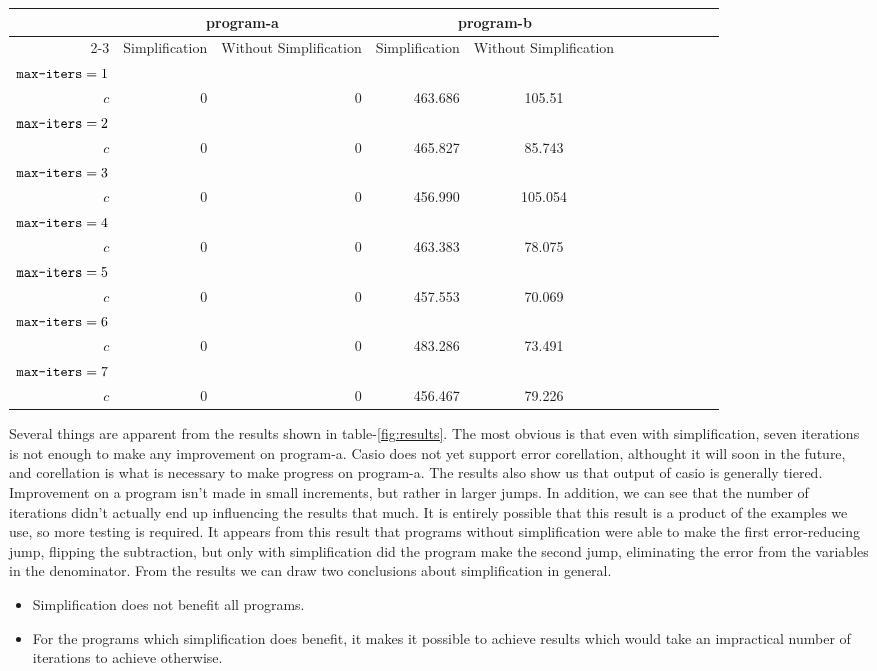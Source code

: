 \documentclass{article}
\begin{document}
\newcommand{\ra}[1]{\renewcommand{\arraystretch}{#1}}
\begin{table*}\centering
\ra{0.8}
\begin{tabular}{@{}rrrrcrrrcrrr@{}}
\toprule&\multicolumn{2}{c}{program-a} &\multicolumn{2}{c}{program-b} &\\
\cmidrule{2-3}\cmidrule{4-5}
& Simplification & Without Simplification & Simplification & Without Simplification\\ \midrule
$\verb|max-iters|=1$\\
$c$ & 0 & 0 & 463.686 & 105.51\\
$\verb|max-iters|=2$\\
$c$ & 0 & 0 & 465.827 & 85.743\\
$\verb|max-iters|=3$\\
$c$ & 0 & 0 & 456.990 & 105.054\\
$\verb|max-iters|=4$\\
$c$ & 0 & 0 & 463.383 & 78.075\\
$\verb|max-iters|=5$\\
$c$ & 0 & 0 & 457.553 & 70.069\\
$\verb|max-iters|=6$\\
$c$ & 0 & 0 & 483.286 & 73.491\\
$\verb|max-iters|=7$\\
$c$ & 0 & 0 & 456.467 & 79.226\\
\bottomrule
\end{tabular}
\label{fig:results}
\caption{program-a is $\frac{e^x - 1}{x}$,
and program-b is $\sqrt{x+1} - \sqrt{x}$}
\end{table*}

Several things are apparent from the results
shown in table-\ref{fig:results}.
The most obvious is that even with simplification,
seven iterations is not enough
to make any improvement on program-a.
Casio does not yet support error corellation,
althought it will soon in the future,
and corellation is what is necessary
to make progress on program-a.
The results also show us that output of casio
is generally tiered.
Improvement on a program isn't made in small increments,
but rather in larger jumps.
In addition, we can see that the number of iterations
didn't actually end up influencing the results that much.
It is entirely possible that
this result is a product of the examples we use,
so more testing is required.
It appears from this result that programs without simplification
were able to make the first error-reducing jump,
flipping the subtraction,
but only with simplification did the program make the second jump,
eliminating the error from the variables in the denominator.
From the results we can draw
two conclusions about simplification in general.
\begin{itemize}
\item Simplification does not benefit all programs.
\item For the programs which simplification does benefit,
it makes it possible to achieve results which would take
an impractical number of iterations to achieve otherwise.
\end{itemize}
\end{document}
